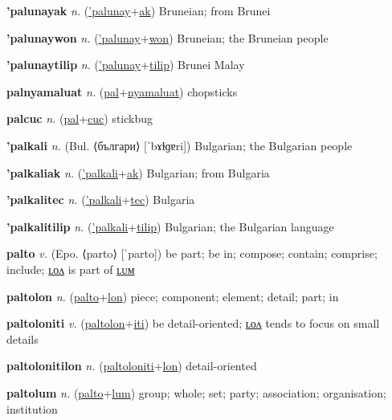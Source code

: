\textbf{\hypertarget{'palunayak}{'palunayak}} \textit{n.} (\hyperlink{'palunay}{'palunay}+\allowbreak \hyperlink{ak}{ak})
Bruneian; from Brunei

\textbf{\hypertarget{'palunaywon}{'palunaywon}} \textit{n.} (\hyperlink{'palunay}{'palunay}+\allowbreak \hyperlink{won}{won})
Bruneian; the Bruneian people

\textbf{\hypertarget{'palunaytilip}{'palunaytilip}} \textit{n.} (\hyperlink{'palunay}{'palunay}+\allowbreak \hyperlink{tilip}{tilip})
Brunei Malay

\textbf{\hypertarget{palnyamaluat}{palnyamaluat}} \textit{n.} (\hyperlink{pal}{pal}+\allowbreak \hyperlink{nyamaluat}{nyamaluat})
chopsticks

\textbf{\hypertarget{palcuc}{palcuc}} \textit{n.} (\hyperlink{pal}{pal}+\allowbreak \hyperlink{cuc}{cuc})
stickbug

\textbf{\hypertarget{'palkali}{'palkali}} \textit{n.} (Bul. ⟨българи⟩ [ˈbɤɫɡɐri])
Bulgarian; the Bulgarian people

\textbf{\hypertarget{'palkaliak}{'palkaliak}} \textit{n.} (\hyperlink{'palkali}{'palkali}+\allowbreak \hyperlink{ak}{ak})
Bulgarian; from Bulgaria

\textbf{\hypertarget{'palkalitec}{'palkalitec}} \textit{n.} (\hyperlink{'palkali}{'palkali}+\allowbreak \hyperlink{tec}{tec})
Bulgaria

\textbf{\hypertarget{'palkalitilip}{'palkalitilip}} \textit{n.} (\hyperlink{'palkali}{'palkali}+\allowbreak \hyperlink{tilip}{tilip})
Bulgarian; the Bulgarian language

\textbf{\hypertarget{palto}{palto}} \textit{v.} (Epo. ⟨parto⟩ [ˈparto])
be part; be in; compose; contain; comprise; include; \hyperlink{paltolon}{ʟᴏᴧ} is part of \hyperlink{paltolum}{ʟᴜᴍ}

\textbf{\hypertarget{paltolon}{paltolon}} \textit{n.} (\hyperlink{palto}{palto}+\allowbreak \hyperlink{lon}{lon})
piece; component; element; detail; part; in

\textbf{\hypertarget{paltoloniti}{paltoloniti}} \textit{v.} (\hyperlink{paltolon}{paltolon}+\allowbreak \hyperlink{iti}{iti})
be detail-oriented; \hyperlink{paltolonitilon}{ʟᴏᴧ} tends to focus on small details

\textbf{\hypertarget{paltolonitilon}{paltolonitilon}} \textit{n.} (\hyperlink{paltoloniti}{paltoloniti}+\allowbreak \hyperlink{lon}{lon})
detail-oriented

\textbf{\hypertarget{paltolum}{paltolum}} \textit{n.} (\hyperlink{palto}{palto}+\allowbreak \hyperlink{lum}{lum})
group; whole; set; party; association; organisation; institution

